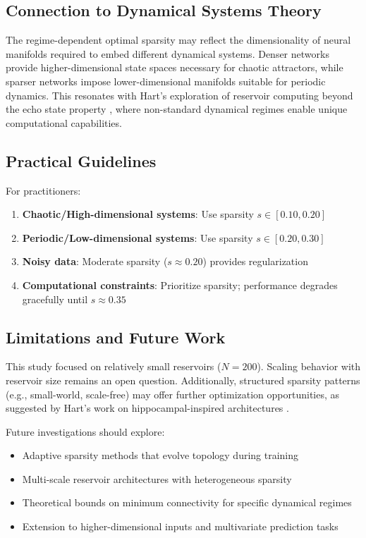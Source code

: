 \documentclass[11pt,a4paper]{article}
\begin{document}
\subsection{Connection to Dynamical Systems Theory}

The regime-dependent optimal sparsity may reflect the dimensionality of neural manifolds required to embed different dynamical systems. Denser networks provide higher-dimensional state spaces necessary for chaotic attractors, while sparser networks impose lower-dimensional manifolds suitable for periodic dynamics. This resonates with Hart's exploration of reservoir computing beyond the echo state property \citep{hart2021thesis}, where non-standard dynamical regimes enable unique computational capabilities.

\subsection{Practical Guidelines}

For practitioners:
\begin{enumerate}
    \item \textbf{Chaotic/High-dimensional systems}: Use sparsity $s \in [0.10, 0.20]$
    \item \textbf{Periodic/Low-dimensional systems}: Use sparsity $s \in [0.20, 0.30]$
    \item \textbf{Noisy data}: Moderate sparsity ($s \approx 0.20$) provides regularization
    \item \textbf{Computational constraints}: Prioritize sparsity; performance degrades gracefully until $s \approx 0.35$
\end{enumerate}

\subsection{Limitations and Future Work}

This study focused on relatively small reservoirs ($N=200$). Scaling behavior with reservoir size remains an open question. Additionally, structured sparsity patterns (e.g., small-world, scale-free) may offer further optimization opportunities, as suggested by Hart's work on hippocampal-inspired architectures \citep{hart2025hippocampal}.

Future investigations should explore:
\begin{itemize}
    \item Adaptive sparsity methods that evolve topology during training
    \item Multi-scale reservoir architectures with heterogeneous sparsity
    \item Theoretical bounds on minimum connectivity for specific dynamical regimes
    \item Extension to higher-dimensional inputs and multivariate prediction tasks
\end{itemize}
\end{document}
